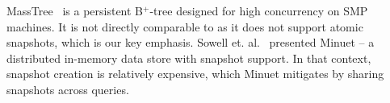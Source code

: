 MassTree~\cite{Mao:2012} is a persistent B$^{+}$-tree designed for high concurrency on SMP 
machines. It is not directly comparable to {\kiwi} as it does not support atomic snapshots, which is our key emphasis. 
Sowell et. al.~\cite{Sowell:2012} presented Minuet -- a distributed in-memory data store with snapshot support. 
In that context, snapshot creation is relatively expensive, which Minuet mitigates by sharing snapshots across queries. 



